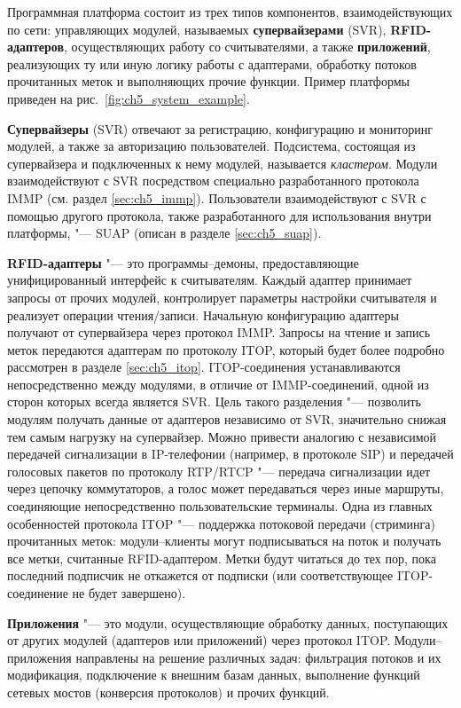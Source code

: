 Программная платформа состоит из трех типов компонентов, взаимодействующих по сети: управляющих модулей, называемых \textbf{супервайзерами} (SVR), \textbf{RFID-адаптеров}, осуществляющих работу со считывателями, а также \textbf{приложений}, реализующих ту или иную логику работы с адаптерами, обработку потоков прочитанных меток и выполняющих прочие функции. Пример платформы приведен на рис.~\ref{fig:ch5_system_example}.

\textbf{Супервайзеры} (SVR) отвечают за регистрацию, конфигурацию и мониторинг модулей, а также за авторизацию пользователей. Подсистема, состоящая из супервайзера и подключенных к нему модулей, называется \textit{кластером}. Модули взаимодействуют с SVR посредством специально разработанного протокола IMMP (см. раздел \ref{sec:ch5_immp}). Пользователи взаимодействуют с SVR с помощью другого протокола, также разработанного для использования внутри платформы, "--- SUAP (описан в разделе \ref{sec:ch5_suap}).

\textbf{RFID-адаптеры} "--- это программы--демоны, предоставляющие унифицированный интерфейс к считывателям. Каждый адаптер принимает запросы от прочих модулей, контролирует параметры настройки считывателя и реализует операции чтения/записи. Начальную конфигурацию адаптеры получают от супервайзера через протокол IMMP. Запросы на чтение и запись меток передаются адаптерам по протоколу ITOP, который будет более подробно рассмотрен в разделе \ref{sec:ch5_itop}. ITOP-соединения устанавливаются непосредственно между модулями, в отличие от IMMP-соединений, одной из сторон которых всегда является SVR. Цель такого разделения "--- позволить модулям получать данные от адаптеров независимо от SVR, значительно снижая тем самым нагрузку на супервайзер. Можно привести аналогию с независимой передачей сигнализации в IP-телефонии (например, в протоколе SIP) и передачей голосовых пакетов по протоколу RTP/RTCP "--- передача сигнализации идет через цепочку коммутаторов, а голос может передаваться через иные маршруты, соединяющие непосредственно пользовательские терминалы. Одна из главных особенностей протокола ITOP "--- поддержка потоковой передачи (стриминга) прочитанных меток: модули--клиенты могут подписываться на поток и получать все метки, считанные RFID-адаптером. Метки будут читаться до тех пор, пока последний подписчик не откажется от подписки (или соответствующее ITOP-соединение не будет завершено).

\textbf{Приложения} "--- это модули, осуществляющие обработку данных, поступающих от других модулей (адаптеров или приложений) через протокол ITOP. Модули--приложения направлены на решение различных задач: фильтрация потоков и их модификация, подключение к внешним базам данных, выполнение функций сетевых мостов (конверсия протоколов) и прочих функций.


